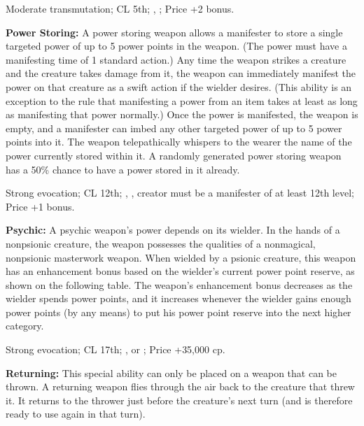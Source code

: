 Moderate transmutation; CL 5th; , ; Price +2 bonus.

\textbf{Power Storing:} A power storing weapon allows a manifester to store a single targeted power of up to 5 power points in the weapon. (The power must have a manifesting time of 1 standard action.) Any time the weapon strikes a creature and the creature takes damage from it, the weapon can immediately manifest the power on that creature as a swift action if the wielder desires. (This ability is an exception to the rule that manifesting a power from an item takes at least as long as manifesting that power normally.) Once the power is manifested, the weapon is empty, and a manifester can imbed any other targeted power of up to 5 power points into it. The weapon telepathically whispers to the wearer the name of the power currently stored within it. A randomly generated power storing weapon has a 50\% chance to have a power stored in it already.

Strong evocation; CL 12th; , , creator must be a manifester of at least 12th level; Price +1 bonus.

\textbf{Psychic:} A psychic weapon's power depends on its wielder. In the hands of a nonpsionic creature, the weapon possesses the qualities of a nonmagical, nonpsionic masterwork weapon. When wielded by a psionic creature, this weapon has an enhancement bonus based on the wielder's current power point reserve, as shown on the following table. The weapon's enhancement bonus decreases as the wielder spends power points, and it increases whenever the wielder gains enough power points (by any means) to put his power point reserve into the next higher category.


Strong evocation; CL 17th; ,  or ; Price +35,000 cp.

\textbf{Returning:} This special ability can only be placed on a weapon that can be thrown. A returning weapon flies through the air back to the creature that threw it. It returns to the thrower just before the creature's next turn (and is therefore ready to use again in that turn).

